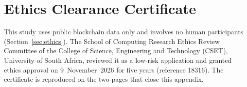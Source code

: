 \section{Ethics Clearance Certificate}
\label{ch:appendix-ethics}

This study uses public blockchain data only and involves no human participants (Section~\ref{sec:ethics}). The School of Computing Research Ethics Review Committee of the College of Science, Engineering and Technology (CSET), University of South Africa, reviewed it as a low-risk application and granted ethics approval on 9~November~2026 for five years (reference 18316). The certificate is reproduced on the two pages that close this appendix.

\clearpage

